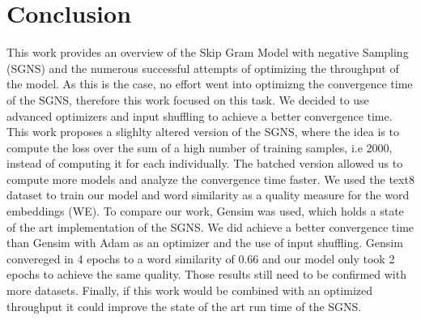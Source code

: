 
\section{Conclusion}\label{sec:conclusion}

This work provides an overview of the Skip Gram Model with negative Sampling (SGNS) and the numerous successful attempts of optimizing the throughput of the model. As this is the case, no effort went into optimizng the convergence time of the SGNS, therefore this work focused on this task. We decided to use advanced optimizers and input shuffling to achieve a better convergence time. This work proposes a slighlty altered version of the SGNS, where the idea is to compute the loss over the sum of a high number of training samples, i.e 2000,  instead of computing it for each individually. The batched version allowed us to compute more models and analyze the convergence time faster. We used the text8 dataset to train our model and  word similarity as a quality measure for the word embeddings (WE).
To compare our work, Gensim was used, which holds a state of the art implementation of the SGNS. We did achieve a better convergence time than Gensim with Adam as an optimizer and the use of input shuffling. Gensim convereged in 4 epochs to a word similarity of 0.66 and our model only took 2 epochs to achieve the same quality. Those results still need to be confirmed with more datasets. Finally, if this work would be combined with an optimized throughput it  could improve the state of the art run time of the SGNS.